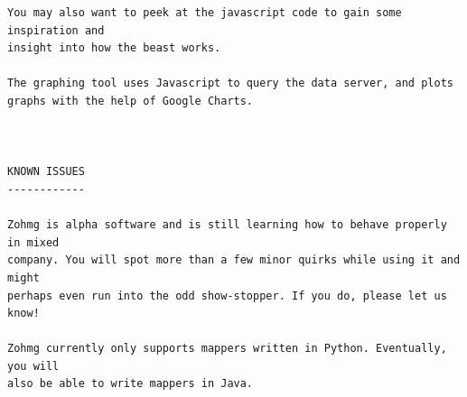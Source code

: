 \begin{verbatim}
You may also want to peek at the javascript code to gain some inspiration and
insight into how the beast works.

The graphing tool uses Javascript to query the data server, and plots
graphs with the help of Google Charts.



KNOWN ISSUES
------------

Zohmg is alpha software and is still learning how to behave properly in mixed
company. You will spot more than a few minor quirks while using it and might
perhaps even run into the odd show-stopper. If you do, please let us know!

Zohmg currently only supports mappers written in Python. Eventually, you will
also be able to write mappers in Java.
\end{verbatim}



